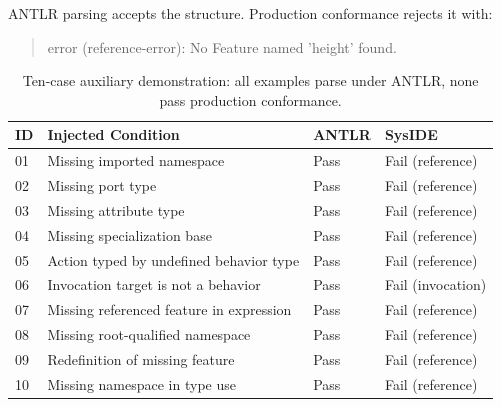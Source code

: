 ANTLR parsing accepts the structure. Production conformance rejects it with:
\begin{quote}
\small\ttfamily
error (reference-error): No Feature named 'height' found.
\end{quote}

\begin{table}[H]
\centering
\caption{Ten-case auxiliary demonstration: all examples parse under ANTLR, none pass production conformance.}
\label{tab:antlr_vs_syside_10cases}
\scriptsize
\setlength{\tabcolsep}{3pt}
\begin{tabular}{p{} p{} p{} p{}}
\toprule
\textbf{ID} & \textbf{Injected Condition} & \textbf{ANTLR} & \textbf{SysIDE} \\
\midrule
01 & Missing imported namespace & Pass & Fail (reference) \\
02 & Missing port type & Pass & Fail (reference) \\
03 & Missing attribute type & Pass & Fail (reference) \\
04 & Missing specialization base & Pass & Fail (reference) \\
05 & Action typed by undefined behavior type & Pass & Fail (reference) \\
06 & Invocation target is not a behavior & Pass & Fail (invocation) \\
07 & Missing referenced feature in expression & Pass & Fail (reference) \\
08 & Missing root-qualified namespace & Pass & Fail (reference) \\
09 & Redefinition of missing feature & Pass & Fail (reference) \\
10 & Missing namespace in type use & Pass & Fail (reference) \\
\bottomrule
\end{tabular}
\end{table}

